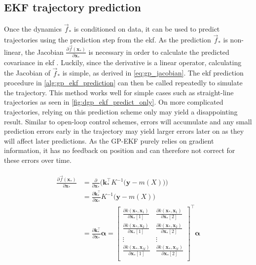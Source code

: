 \subsection{EKF trajectory prediction}
Once the dynamics $\vec{f}_*$ is conditioned on data, it can be used to predict trajectories using the prediction step from the \acrshort{ekf}. As the prediction $\vec{f}_*$ is non-linear, the Jacobian $\frac{\partial \vec{f}(\boldsymbol{x}_*)}{\partial \boldsymbol{x}_*}$ is necessary in order to calculate the predicted covariance in \acrshort{ekf} \cite{gpekf}. Luckily, since the derivative is a linear operator, calculating the Jacobian of $\vec{f}_*$ is simple, as derived in \cref{eq:gp_jacobian}. The \acrshort{ekf} prediction procedure in \cref{alg:gp_ekf_prediction} can then be called repeatedly to simulate the trajectory. This method works well for simple cases such as straight-line trajectories as seen in \cref{fig:dgp_ekf_predict_only}. On more complicated trajectories, relying on this prediction scheme only may yield a disappointing result. Similar to open-loop control schemes, errors will accumulate and any small prediction errors early in the trajectory may yield larger errors later on as they will affect later predictions. As the GP-EKF purely relies on gradient information, it has no feedback on position and can therefore not correct for these errors over time.




\begin{align}\label{eq:gp_jacobian}
    \begin{split}
        \frac{\partial \vec{f}(\boldsymbol{x}_*)}{\partial \boldsymbol{x}_*} &= \frac{\partial}{\partial \boldsymbol{x}_*} \bigg(\boldsymbol{k}_*^\intercal K^{-1} \big(\boldsymbol{y} - m(X)\big)\bigg)\\
        &= \frac{\partial \boldsymbol{k}_*^\intercal}{\partial \boldsymbol{x}_*} K^{-1} \big(\boldsymbol{y} - m(X)\big)\\
        &= \frac{\partial \boldsymbol{k}_*^\intercal}{\partial \boldsymbol{x}_*} \boldsymbol{\alpha} = \begin{bmatrix}
            \frac{\partial k(\boldsymbol{x}_*, \boldsymbol{x}_1)}{\partial \boldsymbol{x}_*[1]} & \frac{\partial k(\boldsymbol{x}_*, \boldsymbol{x}_1)}{\partial \boldsymbol{x}_*[2]} \\
            \frac{\partial k(\boldsymbol{x}_*, \boldsymbol{x}_2)}{\partial \boldsymbol{x}_*[1]} & \frac{\partial k(\boldsymbol{x}_*, \boldsymbol{x}_2)}{\partial \boldsymbol{x}_*[2]} \\
            \vdots & \vdots \\
            \frac{\partial k(\boldsymbol{x}_*, \boldsymbol{x}_N)}{\partial \boldsymbol{x}_*[1]} & \frac{\partial k(\boldsymbol{x}_*, \boldsymbol{x}_N)}{\partial \boldsymbol{x}_*[2]} \\
        \end{bmatrix}^\intercal \boldsymbol{\alpha}
    \end{split}
\end{align}

